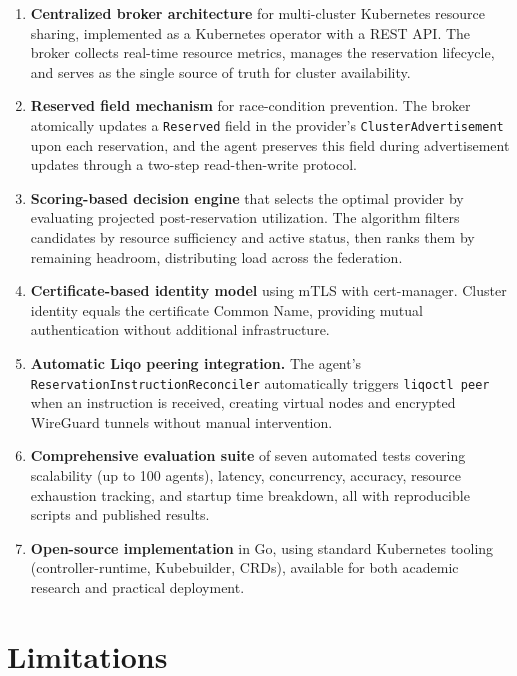 \begin{enumerate}
    \item \textbf{Centralized broker architecture} for multi-cluster Kubernetes resource sharing, implemented as a Kubernetes operator with a REST API. The broker collects real-time resource metrics, manages the reservation lifecycle, and serves as the single source of truth for cluster availability.

    \item \textbf{Reserved field mechanism} for race-condition prevention. The broker atomically updates a \texttt{Reserved} field in the provider's \texttt{ClusterAdvertisement} upon each reservation, and the agent preserves this field during advertisement updates through a two-step read-then-write protocol.

    \item \textbf{Scoring-based decision engine} that selects the optimal provider by evaluating projected post-reservation utilization. The algorithm filters candidates by resource sufficiency and active status, then ranks them by remaining headroom, distributing load across the federation.

    \item \textbf{Certificate-based identity model} using mTLS with cert-manager. Cluster identity equals the certificate Common Name, providing mutual authentication without additional infrastructure.

    \item \textbf{Automatic Liqo peering integration.} The agent's \texttt{ReservationInstructionReconciler} automatically triggers \texttt{liqoctl peer} when an instruction is received, creating virtual nodes and encrypted WireGuard tunnels without manual intervention.

    \item \textbf{Comprehensive evaluation suite} of seven automated tests covering scalability (up to 100 agents), latency, concurrency, accuracy, resource exhaustion tracking, and startup time breakdown, all with reproducible scripts and published results.

    \item \textbf{Open-source implementation} in Go, using standard Kubernetes tooling (controller-runtime, Kubebuilder, CRDs), available for both academic research and practical deployment.
\end{enumerate}


\section{Limitations}
\label{sec:limitations-final}

